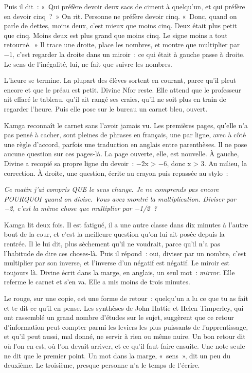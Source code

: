 \documentclass[10.5pt,twoside,openright]{book}
\begin{document}
Puis il dit : « Qui préfère devoir deux sacs de ciment à quelqu’un, et qui préfère en devoir cinq ? » On rit. Personne ne préfère devoir cinq. « Donc, quand on parle de dettes, moins deux, c’est mieux que moins cinq. Deux était plus petit que cinq. Moins deux est plus grand que moins cinq. Le signe moins a tout retourné. » Il trace une droite, place les nombres, et montre que multiplier par −1, c’est regarder la droite dans un miroir : ce qui était à gauche passe à droite. Le sens de l’inégalité, lui, ne fait que suivre les nombres.

L’heure se termine. La plupart des élèves sortent en courant, parce qu’il pleut encore et que le préau est petit. Divine Nfor reste. Elle attend que le professeur ait effacé le tableau, qu’il ait rangé ses craies, qu’il ne soit plus en train de regarder l’heure. Puis elle pose sur le bureau un carnet bleu, ouvert.

Kamga reconnaît le carnet sans l’avoir jamais vu. Les premières pages, qu’elle n’a pas pensé à cacher, sont pleines de phrases en français, une par ligne, avec à côté une règle d’accord, parfois une traduction en anglais entre parenthèses. Il ne pose aucune question sur ces pages-là. La page ouverte, elle, est nouvelle. À gauche, Divine a recopié sa propre ligne du devoir : −2x > −6, donc x > 3. Au milieu, la correction. À droite, une question, écrite au crayon puis repassée au stylo :

\emph{Ce matin j’ai compris QUE le sens change. Je ne comprends pas encore POURQUOI quand on divise. Vous avez montré la multiplication. Diviser par −2, c’est la même chose que multiplier par −1/2 ?}

Kamga lit deux fois. Il est fatigué, il a une autre classe dans dix minutes à l’autre bout de la cour, et c’est la meilleure question qu’on lui ait posée depuis la rentrée. Il le lui dit, plus sèchement qu’il ne voudrait, parce qu’il n’a pas l’habitude de dire ces choses-là. Puis il répond : oui, diviser par un nombre, c’est multiplier par son inverse, et l’inverse d’un négatif est négatif. Le miroir est toujours là. Divine écrit dans la marge, en anglais, un seul mot : \emph{mirror}. Elle referme le carnet et s’en va. Elle a mis moins de trois minutes.

Le rouge, sur une copie, est une forme de retour : quelqu’un a lu ce que tu as fait et te dit ce qu’il en pense. Les synthèses de John Hattie et Helen Timperley, qui ont rassemblé un grand nombre d’études sur le sujet, suggèrent que ce retour d’information peut compter parmi les leviers les plus puissants de l’apprentissage, et qu’il peut aussi, mal donné, ne servir à rien ou même nuire. Un bon retour dit où l’on en est, où l’on devait arriver, et ce qu’il faut faire ensuite. Une note seule ne dit que le premier point. Un mot dans la marge, « sens », dit un peu du deuxième. Le troisième, presque personne n’a le temps de l’écrire.
\end{document}
